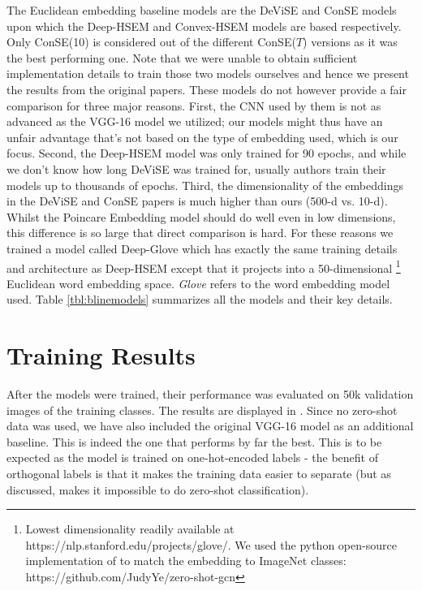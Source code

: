 \documentclass[12pt]{report}
\begin{document}
The Euclidean embedding baseline models are the DeViSE \cite{Frome2013} and ConSE \cite{Norouzi2013} models upon which the Deep-HSEM and Convex-HSEM models are based respectively. Only ConSE(10) is considered out of the different ConSE($T$) versions as it was the best performing one. Note that we were unable to obtain sufficient implementation details to train those two models ourselves and hence we present the results from the original papers. These models do not however provide a fair comparison for three major reasons. First, the CNN used by them is not as advanced as the VGG-16 model we utilized; our models might thus have an unfair advantage that's not based on the type of embedding used, which is our focus. Second, the Deep-HSEM model was only trained for 90 epochs, and while we don't know how long DeViSE was trained for, usually authors train their models up to thousands of epochs. Third, the dimensionality of the embeddings in the DeViSE and ConSE papers is much higher than ours (500-d vs. 10-d). Whilst the Poincare Embedding model should do well even in low dimensions, this difference is so large that direct comparison is hard. For these reasons we trained a model called Deep-Glove which has exactly the same training details and architecture as Deep-HSEM except that it projects into a 50-dimensional \footnote{Lowest dimensionality readily available at https://nlp.stanford.edu/projects/glove/. We used the python open-source implementation of \cite{Wang2018a} to match the embedding to ImageNet classes: https://github.com/JudyYe/zero-shot-gcn} Euclidean word embedding space. \textit{Glove} \cite{Pennington2014} refers to the word embedding model used. Table \ref{tbl:blinemodels} summarizes all the models and their key details.

\section{Training Results}
After the models were trained, their performance was evaluated on 50k validation images of the training classes. The results are displayed in . Since no zero-shot data was used, we have also included the original VGG-16 model as an additional baseline. This is indeed the one that performs by far the best. This is to be expected as the model is trained on one-hot-encoded labels - the benefit of orthogonal labels is that it makes the training data easier to separate (but as discussed, makes it impossible to do zero-shot classification). 
\end{document}
